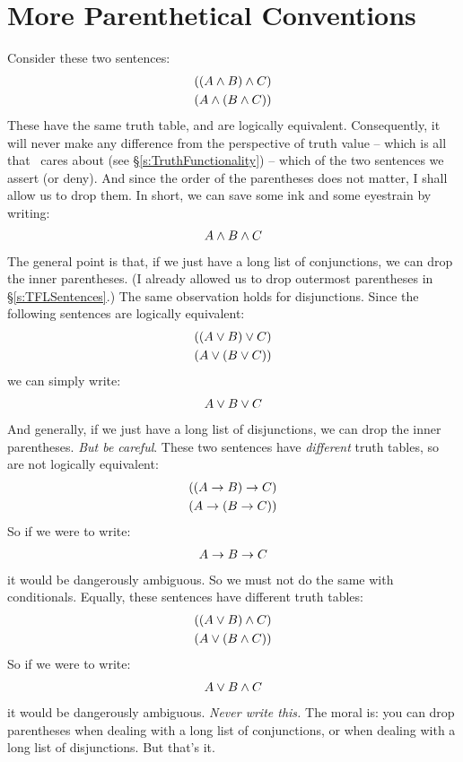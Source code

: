 \section{More Parenthetical Conventions}\label{s:MoreParentheticalConventions}
Consider these two sentences:
	\begin{align*}
		((A \wedge B) \wedge C)\\
		(A \wedge (B \wedge C))
	\end{align*}
These have the same truth table, and are logically equivalent.  Consequently, it will never make any difference from the perspective of truth value – which is all that \TFL\ cares about (see §\ref{s:TruthFunctionality}) – which of the two sentences we assert (or deny). And since the order of the parentheses does not matter, I shall allow us to drop them.  In short, we can save some ink and some eyestrain by writing:
	\begin{align*}
		A \wedge B \wedge C
	\end{align*}
The general point is that, if we just have a long list of conjunctions, we can drop the inner parentheses. (I already allowed us to drop outermost parentheses in §\ref{s:TFLSentences}.) The same observation holds for disjunctions. Since the following sentences are logically equivalent:
	\begin{align*}
		((A \vee B) \vee C)\\
		(A \vee (B \vee C))
	\end{align*}
we can simply write:
	\begin{align*}
		A \vee B \vee C
	\end{align*}
And generally, if we just have a long list of disjunctions, we can drop the inner parentheses. \emph{But be careful}. These two sentences have \emph{different} truth tables, so are not logically equivalent:
	\begin{align*}
		((A \rightarrow B) \rightarrow C)\\
		(A \rightarrow (B \rightarrow C))
	\end{align*}
So if we were to write:
	\begin{align*}
		A \rightarrow B \rightarrow C
	\end{align*}
it would be dangerously ambiguous. So we must not do the same with conditionals. Equally, these sentences have different truth tables:
	\begin{align*}
		((A \vee B) \wedge C)\\
		(A \vee (B \wedge C))
	\end{align*}
So if we were to write:
	\begin{align*}
		A \vee B \wedge C
	\end{align*}
it would be dangerously ambiguous. \emph{Never write this.} The moral is: you can drop parentheses when dealing with a long list of conjunctions, or when dealing with a long list of disjunctions. But that's it.


